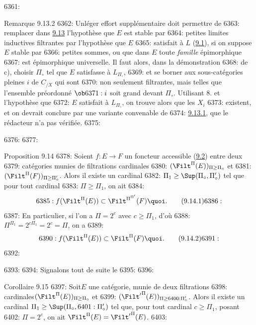 6361: \begin{enonce*}[remark]{Remarque 9.13.2}
6362: Un\pageoriginale léger effort supplémentaire doit permettre de
6363: remplacer dans \hyperref[I.prop9.13]{9.13} l'hypothèse que $E$ est stable par
6364: petites limites inductives filtrantes par l'hypothèse que $E$
6365: satisfait à $L$ (\hyperref[I.def9.1]{9.1}), si on suppose $E$ stable par
6366: petites sommes, ou que dans $E$ toute \emph{famille} épimorphique
6367: est épimorphique universelle. Il faut alors, dans la démonstration
6368: de c), choisir $\Pi_\circ$ tel que $E$ satisfasse à $L_{\Pi_\circ}$,
6369: et se borner aux sous-catégories pleines $i$ de $C_{/X}$ qui sont
6370: non seulement filtrantes, mais telles que l'ensemble préordonné $\ob
6371: i$ soit grand devant $\Pi_\circ$. Utilisant 8. et l'hypothèse que
6372: $E$ satisfait à $L_{\Pi_\circ}$, on trouve alors que les $X_i$
6373: existent, et on devrait conclure par une variante convenable de
6374: \hyperref[I.lem9.13.1]{9.13.1}, que le rédacteur n'a pas vérifiée.
6375: \end{enonce*}
6376: 
6377: \begin{enonce*}{Proposition 9.14}
6378: Soient $f:E\rightarrow F$ un foncteur accessible (\hyperref[I.def9.2]{9.2}) entre deux
6379: catégories munies de filtrations cardinales
6380: $(\Filt^{\Pi}(E))_{\Pi\geq\Pi_\circ}$ et
6381: $(\Filt^{\Pi}(F))_{\Pi\geq\Pi'_\circ}$. Alors il existe un cardinal
6382: $\Pi_1\geq \Sup(\Pi_\circ, \Pi'_\circ)$ tel que pour tout cardinal
6383: $\Pi\geq \Pi_1$, on ait
6384: \begin{equation}
6385: f(\Filt^{\Pi}(E))\subset \Filt^{\Pi^{\Pi'}}(F){\quoi}.\tag{9.14.1}
6386: \end{equation}
6387: En particulier, si l'on a $\Pi=2^c$ avec $c\geq \Pi_1$, d'où
6388: $\Pi^{\Pi_1}=2^{c\Pi_1}=2^c=\Pi$, on a
6389: \begin{equation}
6390: f(\Filt^{\Pi}(E))\subset \Filt^{\Pi}(F){\quoi}.\tag{9.14.2}
6391: \end{equation}
6392: \end{enonce*}
6393: 
6394: Signalons tout de suite le
6395: 
6396: \begin{enonce*}{Corollaire 9.15}
6397: Soit\pageoriginale $E$ une catégorie, munie de deux filtrations
6398: cardinales\linebreak $(\Filt^{\Pi}(E))_{\Pi\geq\Pi_\circ}$ et
6399: $({\Filt'}^{\Pi}(E))_{\Pi\geq %
6400: \Pi'_\circ}$. Alors il existe un cardinal $\Pi_1\geq \Sup(\Pi_\circ,
6401: \Pi'_\circ)$ tel que, pour tout cardinal $c\geq\Pi_1$, posant
6402: $\Pi=2^c$, on ait $\Filt^{\Pi}(E)={\Filt'}^{\Pi}(E)$.
6403: \end{enonce*}
